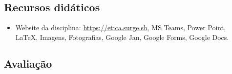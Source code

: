 \documentclass[
	article,			%
	12pt,				%
	twoside,			%
	a4paper,			%
	english,			%
	brazil,				%
	sumario=tradicional
]{plano}
\begin{document}





\begin{snugshade}
	\section{Recursos didáticos} %
\end{snugshade}

\begin{itemize}

	\item Website da disciplina: \href{https://etica.surge.sh}{https://etica.surge.sh},  MS Teams, Power Point, \LaTeX, Imagens, Fotografias, Google Jan, Google Forms, Google Docs.

\end{itemize}

\begin{snugshade}
	\section{Avaliação} %
\end{snugshade}

\end{document}
